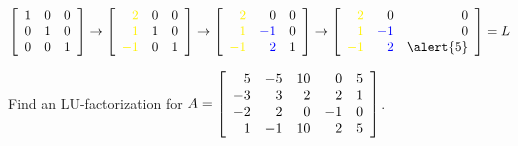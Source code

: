 \documentclass[pdf,9pt]{beamer}
\begin{document}
\begin{frame}[fragile]
\begin{solution}
\begin{equation*}
\leftB \begin{array}{rrr}
    1 & 0 & 0 \\
    0 & 1 & 0 \\
    0 & 0 & 1
\end{array} \rightB \rightarrow
\leftB \begin{array}{rrr}
    \textcolor{yellow}{2}  & 0 & 0 \\
    \textcolor{yellow}{1}  & 1 & 0 \\
    \textcolor{yellow}{-1} & 0 & 1
\end{array} \rightB \rightarrow
\leftB \begin{array}{rrr}
    \textcolor{yellow}{2}  & 0                    & 0 \\
    \textcolor{yellow}{1}  & \textcolor{blue}{-1} & 0 \\
    \textcolor{yellow}{-1} & \textcolor{blue}{2}  & 1
\end{array} \rightB \rightarrow
\leftB \begin{array}{rrr}
    \textcolor{yellow}{2}  & 0                    & 0 \\
    \textcolor{yellow}{1}  & \textcolor{blue}{-1} & 0 \\
    \textcolor{yellow}{-1} & \textcolor{blue}{2}  &\alert{5}
\end{array} \rightB
= L
\end{equation*}
\myQED
\end{solution}
\end{frame}
\begin{frame}[fragile]

\begin{problem} %
Find an LU-factorization for $A = \left[ \begin{array}{rrrrr}
5 & -5 & 10 & 0 & 5 \\
-3 & 3 & 2 & 2 & 1 \\
-2 & 2 & 0 & -1 & 0 \\
1 & -1 & 10 & 2 & 5
\end{array} \right]$.
\end{problem} %
\end{frame}
\end{document}
